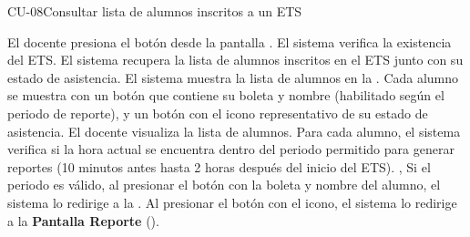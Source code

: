 \begin{UseCase}{CU-08}{Consultar lista de alumnos inscritos a un ETS}
{	}
\end{UseCase}
\begin{UCtrayectoria}
	\UCpaso[\UCactor] El docente presiona el botón  desde la pantalla .
	\UCpaso El sistema verifica la existencia del ETS. 
	\UCpaso El sistema recupera la lista de alumnos inscritos en el ETS junto con su estado de asistencia.  
	\UCpaso El sistema muestra la lista de alumnos en la . Cada alumno se muestra con un botón que contiene su boleta y nombre (habilitado según el periodo de reporte), y un botón con el icono representativo de su estado de asistencia.
	\UCpaso[\UCactor] El docente visualiza la lista de alumnos.
	\UCpaso Para cada alumno, el sistema verifica si la hora actual se encuentra dentro del periodo permitido para generar reportes (10 minutos antes hasta 2 horas después del inicio del ETS). , 
	\UCpaso[\UCactor] Si el periodo es válido, al presionar el botón con la boleta y nombre del alumno, el sistema lo redirige a la .
	\UCpaso[\UCactor] Al presionar el botón con el icono, el sistema lo redirige a la \textbf{Pantalla Reporte} ().
\end{UCtrayectoria}

